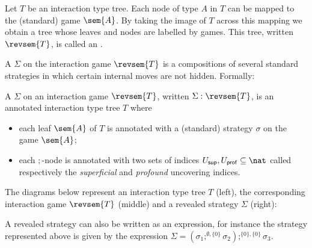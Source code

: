 Let $T$ be an interaction type tree. Each node of type $A$ in $T$
can be mapped to the (standard) game $\sem{A}$. By taking the image
of $T$ across this mapping we obtain a tree whose leaves and nodes
are labelled by games. This tree, written $\revsem{T}$, is called
an .

A  $\Sigma$ on the interaction game $\revsem{T}$ is a compositions of several standard strategies in which certain internal moves are not hidden. Formally:
\begin{definition}
A  $\Sigma$ on an interaction game $\revsem{T}$,
written $\Sigma: \revsem{T}$, is an annotated interaction type
tree $T$ where
\begin{itemize}
\item each leaf $\sem{A}$ of $T$ is annotated with a (standard) strategy $\sigma$ on the game
$\sem{A}$;
\item each $;$-node is annotated with two sets of indices $U_{\sf sup}, U_{\sf prof} \subseteq \nat$ called respectively the
\emph{superficial} and \emph{profound} uncovering indices.
\end{itemize}
\end{definition}

\begin{example}
The diagrams below represent an interaction type tree $T$ (left),
the corresponding interaction game $\revsem{T}$ (middle) and a
revealed strategy $\Sigma$ (right):
\begin{center}
\hspace{5ex}
\hspace{5ex}
\end{center}
\end{example}
A revealed strategy can also be written as an expression, for
instance the strategy represented above is given by the expression
$\Sigma = (\sigma_1 ;^{\emptyset,\{0\}} \sigma_2) ;^{\{0\},\{0\}} \sigma_3$.


